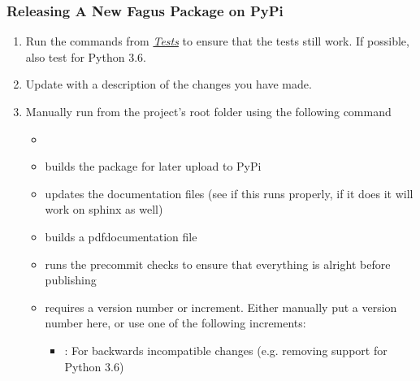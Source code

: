 \documentclass[a4paper,10pt,english]{sphinxmanual}
\begin{document}
\subsubsection{Releasing A New Fagus Package on PyPi}
\label{\detokenize{CONTRIBUTING:releasing-a-new-fagus-package-on-pypi}}\begin{enumerate}
%
\item {}
\sphinxAtStartPar
Run the commands from {\hyperref[\detokenize{CONTRIBUTING:tests}]{\emph{Tests}}} to ensure that the tests still work. If possible, also test for Python 3.6.

\item {}
\sphinxAtStartPar
Update  with a description of the changes you have made.

\item {}
\sphinxAtStartPar
Manually run  from the project’s root folder using the following command
\begin{itemize}
\item {}
\sphinxAtStartPar
{}

\item {}
\sphinxAtStartPar
{} builds the package for later upload to PyPi

\item {}
\sphinxAtStartPar
{} updates the documentation files (see if this runs properly, if it does it will work on sphinx as well)

\item {}
\sphinxAtStartPar
{} builds a pdf\sphinxhyphen{}documentation file

\item {}
\sphinxAtStartPar
{} runs the pre\sphinxhyphen{}commit checks to ensure that everything is alright before publishing

\item {}
\sphinxAtStartPar
{} requires a version number or increment. Either manually put a version number here, or use one of the following increments:
\begin{itemize}
\item {}
\sphinxAtStartPar
{}: For backwards incompatible changes (e.g. removing support for Python 3.6)


\end{itemize}
\end{itemize}
\end{enumerate}
\end{document}

